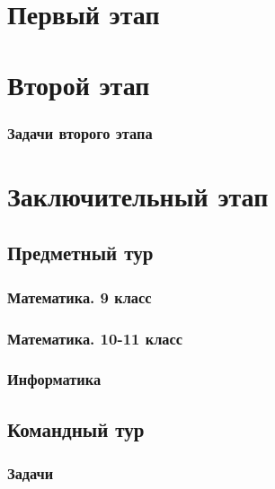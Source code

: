 \documentclass[a4paper,12pt,oneside]{book}
\begin{document}

\setcounter{tocdepth}{1}

\tableofcontents

\part{Первый этап}




\part{Второй этап}

\clearpage
\section{Задачи второго этапа}



\part{Заключительный этап}

\clearpage
\chapter{Предметный тур}

\section{Математика. 9 класс}


\section{Математика. 10-11 класс}


\section{Информатика}


\chapter{Командный тур}

\section{Задачи}

\end{document}
